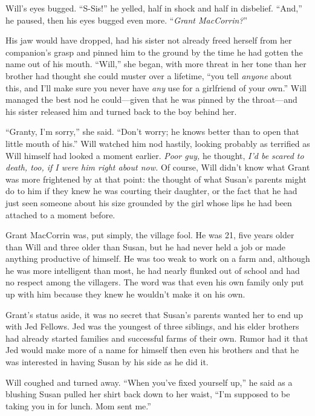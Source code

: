 \documentclass[12pt,letterpaper,oneside,english]{book}
\begin{document}
Will's eyes bugged. ``S-Sis!'' he yelled, half in shock and half in
disbelief. ``And,'' he paused, then his eyes bugged even more.
``\emph{Grant MacCorrin?}''

His jaw would have dropped, had his sister not already freed herself
from her companion's grasp and pinned him to the ground by the time he
had gotten the name out of his mouth. ``Will,'' she began, with more
threat in her tone than her brother had thought she could muster over a
lifetime, ``you tell \emph{anyone} about this, and I'll make sure you
never have \emph{any} use for a girlfriend of your own.'' Will managed
the best nod he could---given that he was pinned by the throat---and his
sister released him and turned back to the boy behind her. 

``Granty, I'm sorry,'' she said. ``Don't worry; he knows better than to
open that little mouth of his.'' Will watched him nod hastily, looking
probably as terrified as Will himself had looked a moment earlier.
\textit{Poor guy,} he thought, \textit{I'd be scared to death, too, if I
were him right about now.} Of course, Will didn't know what Grant was
more frightened by at that point: the thought of what Susan's parents
might do to him if they knew he was courting their daughter, or the fact
that he had just seen someone about his size grounded by the girl whose
lips he had been attached to a moment before.

Grant MacCorrin was, put simply, the village fool. He was 21, five years
older than Will and three older than Susan, but he had never held a job or
made anything productive of himself. He was too weak to work on a farm
and, although he was more intelligent than most, he had nearly flunked out
of school and had no respect among the villagers. The word was that even
his own family only put up with him because they knew he wouldn't make it
on his own.

Grant's status aside, it was no secret that Susan's parents wanted her
to end up with Jed Fellows. Jed was the youngest of three siblings, and
his elder brothers had already started families and successful farms of
their own. Rumor had it that Jed would make more of a name for himself
then even his brothers and that he was interested in having Susan by his
side as he did it. 

Will coughed and turned away. ``When you've fixed yourself up,'' he said
as a blushing Susan pulled her shirt back down to her waist, ``I'm
supposed to be taking you in for lunch. Mom sent me.''
\end{document}
